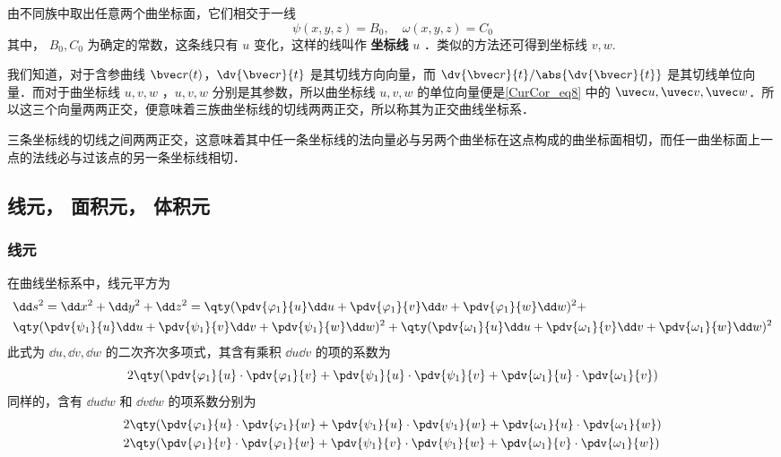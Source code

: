 由不同族中取出任意两个曲坐标面，它们相交于一线
\begin{equation}
\psi(x,y,z)=B_0,\quad \omega(x,y,z)=C_0
\end{equation}
其中， $B_0,C_0$ 为确定的常数，这条线只有 $u$ 变化，这样的线叫作 \textbf{坐标线} $u$ ．类似的方法还可得到坐标线 $v,w$.

我们知道，对于含参曲线 $\bvec r(t)$，$\dv{\bvec r}{t}$ 是其切线方向向量，而 $\dv{\bvec r}{t}/\abs{\dv{\bvec r}{t}}$ 是其切线单位向量．而对于曲坐标线 $u,v,w$ ，$u,v,w$ 分别是其参数，所以曲坐标线 $u,v,w$ 的单位向量便是\autoref{CurCor_eq8} 中的 $\uvec u,\uvec v,\uvec w$．所以这三个向量两两正交，便意味着三族曲坐标线的切线两两正交，所以称其为正交曲线坐标系．

三条坐标线的切线之间两两正交，这意味着其中任一条坐标线的法向量必与另两个曲坐标在这点构成的曲坐标面相切，而任一曲坐标面上一点的法线必与过该点的另一条坐标线相切．

\subsection{线元， 面积元， 体积元}
\subsubsection{线元}
在曲线坐标系中，线元平方为
\begin{equation}\label{CurCor_eq1}
\begin{aligned}
&\dd s^2=\dd x^2+\dd y^2+\dd z^2=\qty(\pdv{\varphi_1}{u}\dd u+\pdv{\varphi_1}{v}\dd v+\pdv{\varphi_1}{w}\dd w)^2+\\ 
&\qty(\pdv{\psi_1}{u}\dd u+\pdv{\psi_1}{v}\dd v+\pdv{\psi_1}{w}\dd w)^2+\qty(\pdv{\omega_1}{u}\dd u+\pdv{\omega_1}{v}\dd v+\pdv{\omega_1}{w}\dd w)^2
\end{aligned}
\end{equation}
此式为 $\dd u,\dd v,\dd w$ 的二次齐次多项式，其含有乘积 $\dd u \dd v$ 的项的系数为
\begin{equation}
2\qty(\pdv{\varphi_1}{u}\cdot\pdv{\varphi_1}{v}+\pdv{\psi_1}{u}\cdot\pdv{\psi_1}{v}+\pdv{\omega_1}{u}\cdot\pdv{\omega_1}{v})
\end{equation}
同样的，含有 $\dd u\dd w$ 和 $\dd v\dd w$ 的项系数分别为
\begin{equation}
\begin{aligned}
& 2\qty(\pdv{\varphi_1}{u}\cdot\pdv{\varphi_1}{w}+\pdv{\psi_1}{u}\cdot\pdv{\psi_1}{w}+\pdv{\omega_1}{u}\cdot\pdv{\omega_1}{w})\\
&2\qty(\pdv{\varphi_1}{v}\cdot\pdv{\varphi_1}{w}+\pdv{\psi_1}{v}\cdot\pdv{\psi_1}{w}+\pdv{\omega_1}{v}\cdot\pdv{\omega_1}{w})
\end{aligned}
\end{equation}


